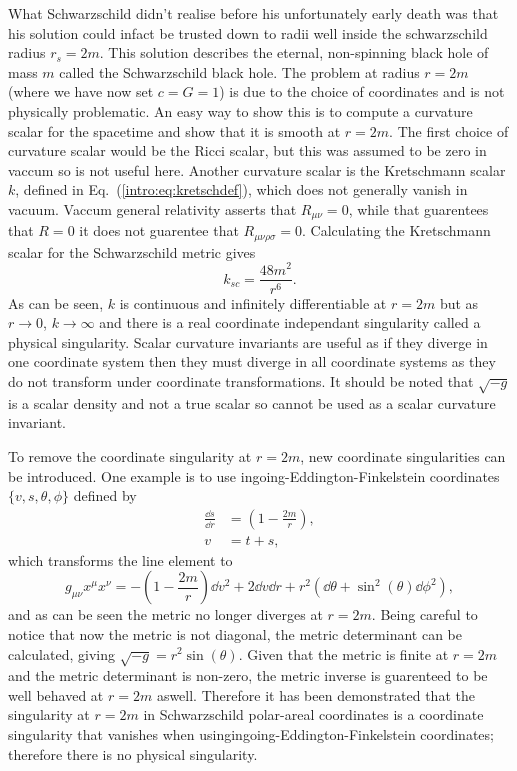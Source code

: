 What Schwarzschild didn't realise before his unfortunately early death was that his solution could infact be trusted down to radii well inside the schwarzschild radius $r_s = 2m$. This solution describes the eternal, non-spinning black hole of mass $m$ called the Schwarzschild black hole. The problem at radius $r=2m$ (where we have now set $c=G=1$) is due to the choice of coordinates and is not physically problematic. An easy way to show this is to compute a curvature scalar for the spacetime and show that it is smooth at $r=2m$. The first choice of curvature scalar would be the Ricci scalar, but this was assumed to be zero in vaccum so is not useful here. Another curvature scalar is the Kretschmann scalar $k$, defined in Eq.~(\ref{intro:eq:kretschdef}), which does not generally vanish in vacuum. Vaccum general relativity asserts that $R_{\mu\nu}=0$, while that guarentees that $R=0$ it does not guarentee that $R_{\mu\nu\rho\sigma}=0$. Calculating the Kretschmann scalar for the Schwarzschild metric gives
\begin{equation}
k_{sc} = \frac{48 m^2}{r^6}.
\end{equation} 
As can be seen, $k$ is continuous and infinitely differentiable at $r=2m$ but as $r\rightarrow0$, $k\rightarrow \infty$ and there is a real coordinate independant singularity called a physical singularity. Scalar curvature invariants are useful as if they diverge in one coordinate system then they must diverge in all coordinate systems as they do not transform under coordinate transformations. It should be noted that $\sqrt{-g}$ is a scalar density and not a true scalar so cannot be used as a scalar curvature invariant.

To remove the coordinate singularity at $r=2m$, new coordinate singularities can be introduced. One example is to use ingoing-Eddington-Finkelstein coordinates $\{ v,s,\theta,\phi \}$ defined by
\begin{align}
\frac{\dd s}{\dd r} &= \left(1-\frac{2m}{r}\right), \\
v &= t + s,
\end{align} 
which transforms the line element to 
\begin{equation}
g_{\mu\nu}x^\mu x^\nu = -\left( 1-\frac{2m}{r}\right) \dd v^2 + 2 \dd v \dd r + r^2 \left(\dd \theta + \sin^2(\theta) \dd \phi^2\right),
\end{equation}
and as can be seen the metric no longer diverges at $r=2m$. Being careful to notice that now the metric is not diagonal, the metric determinant can be calculated, giving $\sqrt{-g} = r^2 \sin(\theta)$. Given that the metric is finite at $r=2m$ and the metric determinant is non-zero, the metric inverse is guarenteed to be well behaved at $r=2m$ aswell. Therefore it has been demonstrated that the singularity at $r=2m$ in Schwarzschild polar-areal coordinates is a coordinate singularity that vanishes when usingingoing-Eddington-Finkelstein coordinates; therefore there is no physical singularity. 

